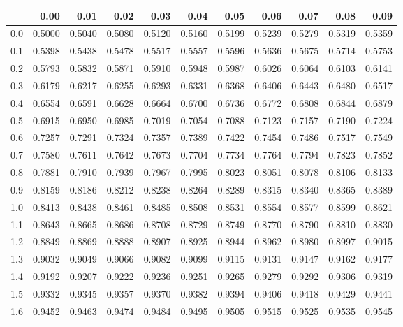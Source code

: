 \documentclass[english]{article}
\begin{document}
{\tiny
\begin{table}[ht]
\centering
\begin{tabular}{r|rrrrrrrrrr}
 & 0.00 & 0.01 & 0.02 & 0.03 & 0.04 & 0.05 & 0.06 & 0.07 & 0.08 & 0.09 \\ 
  \hline
  0.0 & 0.5000 & 0.5040 & 0.5080 & 0.5120 & 0.5160 & 0.5199 & 0.5239 & 0.5279 & 0.5319 & 0.5359 \\ 
  0.1 & 0.5398 & 0.5438 & 0.5478 & 0.5517 & 0.5557 & 0.5596 & 0.5636 & 0.5675 & 0.5714 & 0.5753 \\ 
  0.2 & 0.5793 & 0.5832 & 0.5871 & 0.5910 & 0.5948 & 0.5987 & 0.6026 & 0.6064 & 0.6103 & 0.6141 \\ 
  0.3 & 0.6179 & 0.6217 & 0.6255 & 0.6293 & 0.6331 & 0.6368 & 0.6406 & 0.6443 & 0.6480 & 0.6517 \\ 
  0.4 & 0.6554 & 0.6591 & 0.6628 & 0.6664 & 0.6700 & 0.6736 & 0.6772 & 0.6808 & 0.6844 & 0.6879 \\ 
  0.5 & 0.6915 & 0.6950 & 0.6985 & 0.7019 & 0.7054 & 0.7088 & 0.7123 & 0.7157 & 0.7190 & 0.7224 \\ 
  0.6 & 0.7257 & 0.7291 & 0.7324 & 0.7357 & 0.7389 & 0.7422 & 0.7454 & 0.7486 & 0.7517 & 0.7549 \\ 
  0.7 & 0.7580 & 0.7611 & 0.7642 & 0.7673 & 0.7704 & 0.7734 & 0.7764 & 0.7794 & 0.7823 & 0.7852 \\ 
  0.8 & 0.7881 & 0.7910 & 0.7939 & 0.7967 & 0.7995 & 0.8023 & 0.8051 & 0.8078 & 0.8106 & 0.8133 \\ 
  0.9 & 0.8159 & 0.8186 & 0.8212 & 0.8238 & 0.8264 & 0.8289 & 0.8315 & 0.8340 & 0.8365 & 0.8389 \\ 
  1.0 & 0.8413 & 0.8438 & 0.8461 & 0.8485 & 0.8508 & 0.8531 & 0.8554 & 0.8577 & 0.8599 & 0.8621 \\ 
  1.1 & 0.8643 & 0.8665 & 0.8686 & 0.8708 & 0.8729 & 0.8749 & 0.8770 & 0.8790 & 0.8810 & 0.8830 \\ 
  1.2 & 0.8849 & 0.8869 & 0.8888 & 0.8907 & 0.8925 & 0.8944 & 0.8962 & 0.8980 & 0.8997 & 0.9015 \\ 
  1.3 & 0.9032 & 0.9049 & 0.9066 & 0.9082 & 0.9099 & 0.9115 & 0.9131 & 0.9147 & 0.9162 & 0.9177 \\ 
  1.4 & 0.9192 & 0.9207 & 0.9222 & 0.9236 & 0.9251 & 0.9265 & 0.9279 & 0.9292 & 0.9306 & 0.9319 \\ 
  1.5 & 0.9332 & 0.9345 & 0.9357 & 0.9370 & 0.9382 & 0.9394 & 0.9406 & 0.9418 & 0.9429 & 0.9441 \\ 
  1.6 & 0.9452 & 0.9463 & 0.9474 & 0.9484 & 0.9495 & 0.9505 & 0.9515 & 0.9525 & 0.9535 & 0.9545 \\ 

\end{tabular}
\end{table}}
\end{document}
